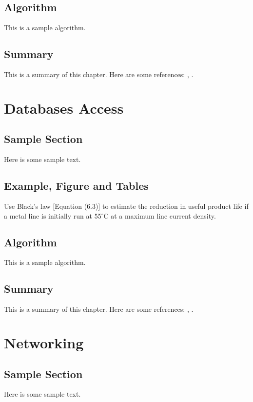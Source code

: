 \documentclass{wileySix}
\begin{document}
\section{Algorithm}
This is a sample algorithm.

\section{Summary}
This is a summary of this chapter.
Here are some references: \cite{xkilby}, \cite{xberen}.

\chapter{Databases Access}

\section{Sample Section}
Here is some sample text.

\section{Example, Figure and Tables}
\vskip6pt
\begin{example}
	Use Black's law [Equation (6.3)] to estimate the reduction in useful product
	life if a metal line is initially run at 55$^\circ$C at a maximum line
	current density.
\end{example}

\section{Algorithm}
This is a sample algorithm.

\section{Summary}
This is a summary of this chapter.
Here are some references: \cite{xkilby}, \cite{xberen}.

\chapter{Networking}

\section{Sample Section}
Here is some sample text.
\end{document}
